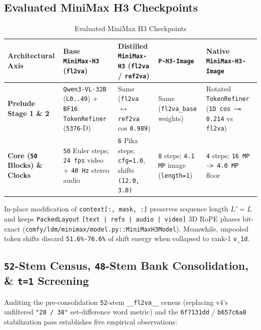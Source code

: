\documentclass[10pt]{article}
\begin{document}
\subsection{Evaluated MiniMax H3 Checkpoints}

\begin{table}[htbp]
\centering
\caption{Evaluated MiniMax H3 Checkpoints}
\scriptsize
\begin{tabularx}{\textwidth}{@{}XXXXX@{}}
\toprule
Architectural Axis & Base \texttt{MiniMax-H3} (\texttt{fl2va}) & Distilled \texttt{MiniMax-H3} (\texttt{fl2va} / \texttt{ref2va}) & \texttt{P-H3-Image} & Native \texttt{MiniMax-H3-Image} \\
\midrule
\textbf{Prelude Stage 1 \& 2} & \texttt{Qwen3-VL-32B} (\texttt{L0..49}) + \texttt{BF16} \texttt{TokenRefiner} (\texttt{5376}-D) & Same (\texttt{fl2va} $\leftrightarrow$ \texttt{ref2va} cos \texttt{0.989}) & Same (\texttt{fl2va\_base} weights) & Rotated \texttt{TokenRefiner} (\texttt{1D cos \textasciitilde{}= 0.214} vs \texttt{fl2va}) \\
\textbf{Core (\texttt{50} Blocks) \& Clocks} & \texttt{50} Euler steps; \texttt{24 fps} video + \texttt{40 Hz} stereo audio & \texttt{6} Pika steps; \texttt{cfg=1.0}, shifts \texttt{(12.0, 3.0)} & \texttt{8} steps; \texttt{4.1 MP} image (\texttt{length=1}) & \texttt{4} steps; \texttt{16 MP -> 4.0 MP} floor \\
\bottomrule
\end{tabularx}
\end{table}

In-place modification of \texttt{context[:, mask, :]} preserves sequence length $L' = L$ and keeps \texttt{PackedLayout} \texttt{[text | refs | audio | video]} 3D RoPE phases bit-exact (\texttt{comfy/ldm/minimax/model.py::MiniMaxH3Model}). Meanwhile, unpooled token shifts discard \texttt{51.6\%-76.6\%} of shift energy when collapsed to rank-1 \texttt{v\_1d}.

\subsection{\texttt{52}-Stem Census, \texttt{48}-Stem Bank Consolidation, \& \texttt{t=1} Screening}

Auditing the pre-consolidation \texttt{52}-stem \texttt{\_\_fl2va\_\_} census (replacing v4's unfiltered \texttt{"28 / 38"} set-difference word metric) and the \texttt{6f7131dd} / \texttt{b657c6a8} stabilization pass establishes five empirical observations:
\end{document}
